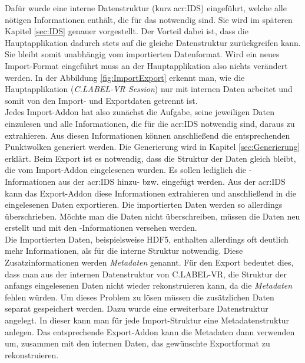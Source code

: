 Dafür wurde eine interne Datenstruktur (kurz \acrshort{acr:IDS}) eingeführt, welche alle nötigen Informationen enthält, die für das  notwendig sind. Sie wird im späteren Kapitel \ref{sec:IDS} genauer vorgestellt. Der Vorteil dabei ist, dass die Hauptapplikation dadurch stets auf die gleiche Datenstruktur zurückgreifen kann. Sie bleibt somit unabhängig vom importierten Datenformat. Wird ein neues Import-Format eingeführt muss an der Hauptapplikation also nichts verändert werden. In der Abbildung \ref{fig:ImportExport} erkennt man, wie die Hauptapplikation (\textit{C.LABEL-VR Session}) nur mit internen Daten arbeitet und somit von den Import- und Exportdaten getrennt ist.\\ 

Jedes Import-Addon hat also zunächst die Aufgabe, seine jeweiligen Daten einzulesen und alle Informationen, die für die \acrshort{acr:IDS} notwendig sind, daraus zu extrahieren. Aus diesen Informationen können anschließend die entsprechenden Punktwolken generiert werden. Die Generierung wird in Kapitel \ref{sec:Generierung} erklärt. Beim Export ist es notwendig, dass die Struktur der Daten gleich bleibt, die vom Import-Addon eingelesenen wurden. Es sollen lediglich die -Informationen aus der \acrshort{acr:IDS} hinzu- bzw. eingefügt werden. Aus der \acrshort{acr:IDS} kann das Export-Addon diese Informationen extrahieren und anschließend in die eingelesenen Daten exportieren. Die importierten Daten werden so allerdings überschrieben. Möchte man die Daten nicht überschreiben, müssen die Daten neu erstellt und mit den -Informationen versehen werden. \\

Die Importierten Daten, beispielsweise HDF5, enthalten allerdings oft deutlich mehr Informationen, als für die interne Struktur notwendig. Diese Zusatzinformationen werden \textit{Metadaten} genannt. Für den Export bedeutet dies, dass man aus der internen Datenstruktur von C.LABEL-VR, die Struktur der anfangs eingelesenen Daten nicht wieder rekonstruieren kann, da die \textit{Metadaten} fehlen würden. Um dieses Problem zu lösen müssen die zusätzlichen Daten separat gespeichert werden. Dazu wurde eine erweiterbare Datenstruktur angelegt. In dieser kann man für jede Import-Struktur eine Metadatenstruktur anlegen. Das entsprechende Export-Addon kann die Metadaten dann verwenden um, zusammen mit den internen Daten, das gewünschte Exportformat zu rekonstruieren. \\

